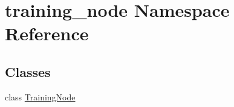 \hypertarget{namespacetraining__node}{}\section{training\+\_\+node Namespace Reference}
\label{namespacetraining__node}
\subsection*{Classes}
\begin{DoxyCompactItemize}
\item 
class \hyperlink{classtraining__node_1_1_training_node}{Training\+Node}
\end{DoxyCompactItemize}
